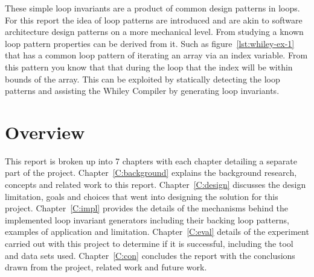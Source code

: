These simple loop invariants are a product of common design patterns in loops.
For this report the idea of loop patterns are introduced and are akin to
software architecture design patterns on a more mechanical level.
From studying a known loop pattern properties can be derived from it.
Such as figure~\ref{lst:whiley-ex-1} that has a common loop pattern of
iterating an array via an index variable.
From this pattern you know that that during the loop that the index will be
within bounds of the array.
This can be exploited by statically detecting the loop patterns and assisting
the Whiley Compiler by generating loop invariants.

\section{Overview}

This report is broken up into 7 chapters with each chapter detailing a separate part of the project.
Chapter~\ref{C:background} explains the background research, concepts and related work to this report.
Chapter~\ref{C:design} discusses the design limitation, goals and choices that went into designing the
solution for this project.
Chapter~\ref{C:impl} provides the details of the mechanisms behind the implemented 
loop invariant generators including their backing loop patterns, examples of application and limitation.
Chapter~\ref{C:eval} details of the experiment carried out with this project to determine if it is
successful, including the tool and data sets used.
Chapter~\ref{C:con} concludes the report with the conclusions drawn from the project,
related work and future work.  
